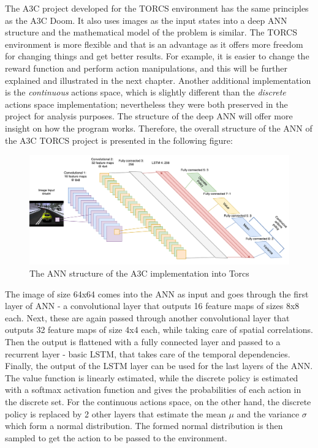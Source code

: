 The A3C project developed for the TORCS environment has the same principles as the A3C Doom. It also uses images as the input states into a deep ANN structure and the mathematical model of the problem is similar. The TORCS environment is more flexible and that is an advantage as it offers more freedom for changing things and get better results. For example, it is easier to change the reward function and perform action manipulations, and this will be further explained and illustrated in the next chapter. Another additional implementation is the \textit{continuous} actions space, which is slightly different than the \textit{discrete} actions space implementation; nevertheless they were both preserved in the project for analysis purposes. The structure of the deep ANN will offer more insight on how the program works. Therefore, the overall structure of the ANN of the A3C TORCS project is presented in the following figure:
\begin{figure}[H]
	\centering
	\includegraphics[width=1.25\textwidth]{Figures/A3CTorcs}
	\caption{The ANN structure of the A3C implementation into Torcs}
	\label{A3CTorcs}
\end{figure}
The image of size 64x64 comes into the ANN as input and goes through the first layer of ANN - a convolutional layer that outputs 16 feature maps of sizes 8x8 each. Next, these are again passed through another convolutional layer that outputs 32 feature maps of size 4x4 each, while taking care of spatial correlations. Then the output is flattened with a fully connected layer and passed to a recurrent layer - basic LSTM, that takes care of the temporal dependencies. Finally, the output of the LSTM layer can be used for the last layers of the ANN. The value function is linearly estimated, while the discrete policy is estimated with a softmax activation function and gives the probabilities of each action in the discrete set. For the continuous actions space, on the other hand, the discrete policy is replaced by 2 other layers that estimate the mean $\mu$ and the variance $\sigma$ which form a normal distribution. The formed normal distribution is then sampled to get the action to be passed to the environment.

